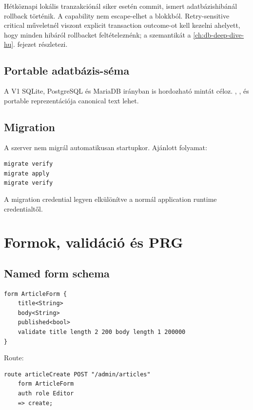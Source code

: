 Hétköznapi lokális tranzakciónál siker esetén commit, ismert adatbázishibánál rollback történik. A  capability nem escape-elhet a blokkból. Retry-sensitive critical műveletnél viszont explicit transaction outcome-ot kell kezelni ahelyett, hogy minden hibáról rollbacket feltételeznénk; a  szemantikát a \ref{ch:db-deep-dive-hu}. fejezet részletezi.

\subsection*{Portable adatbázis-séma}

A V1 SQLite, PostgreSQL és MariaDB irányban is hordozható mintát céloz. , ,  és  portable reprezentációja canonical text lehet.

\subsection*{Migration}

A szerver nem migrál automatikusan startupkor. Ajánlott folyamat:

\begin{lstlisting}
migrate verify
migrate apply
migrate verify
\end{lstlisting}

A migration credential legyen elkülönítve a normál application runtime credentialtől.


\section{Formok, validáció és PRG}

\subsection*{Named form schema}

\begin{lstlisting}[language=Velran]
form ArticleForm {
    title<String>
    body<String>
    published<bool>
    validate title length 2 200 body length 1 200000
}
\end{lstlisting}

Route:

\begin{lstlisting}[language=Velran]
route articleCreate POST "/admin/articles"
    form ArticleForm
    auth role Editor
    => create;
\end{lstlisting}

